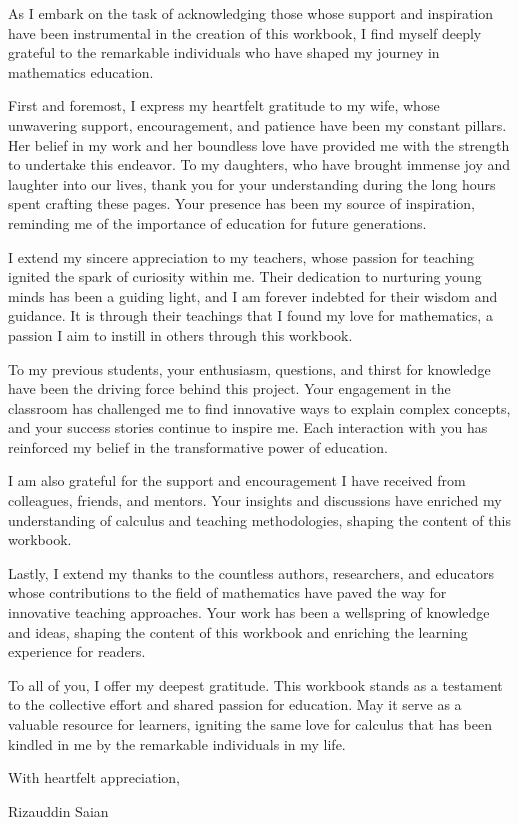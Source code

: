 
As I embark on the task of acknowledging those whose support and inspiration have been instrumental in the creation of this workbook, I find myself deeply grateful to the remarkable individuals who have shaped my journey in mathematics education.

First and foremost, I express my heartfelt gratitude to my wife, whose unwavering support, encouragement, and patience have been my constant pillars. Her belief in my work and her boundless love have provided me with the strength to undertake this endeavor. To my daughters, who have brought immense joy and laughter into our lives, thank you for your understanding during the long hours spent crafting these pages. Your presence has been my source of inspiration, reminding me of the importance of education for future generations.

I extend my sincere appreciation to my teachers, whose passion for teaching ignited the spark of curiosity within me. Their dedication to nurturing young minds has been a guiding light, and I am forever indebted for their wisdom and guidance. It is through their teachings that I found my love for mathematics, a passion I aim to instill in others through this workbook.

To my previous students, your enthusiasm, questions, and thirst for knowledge have been the driving force behind this project. Your engagement in the classroom has challenged me to find innovative ways to explain complex concepts, and your success stories continue to inspire me. Each interaction with you has reinforced my belief in the transformative power of education.

I am also grateful for the support and encouragement I have received from colleagues, friends, and mentors. Your insights and discussions have enriched my understanding of calculus and teaching methodologies, shaping the content of this workbook.

Lastly, I extend my thanks to the countless authors, researchers, and educators whose contributions to the field of mathematics have paved the way for innovative teaching approaches. Your work has been a wellspring of knowledge and ideas, shaping the content of this workbook and enriching the learning experience for readers.

To all of you, I offer my deepest gratitude. This workbook stands as a testament to the collective effort and shared passion for education. May it serve as a valuable resource for learners, igniting the same love for calculus that has been kindled in me by the remarkable individuals in my life.

\vspace{1cm}
\noindent With heartfelt appreciation,

\noindent Rizauddin Saian\\
\noindent \date{8 Oct 2023}